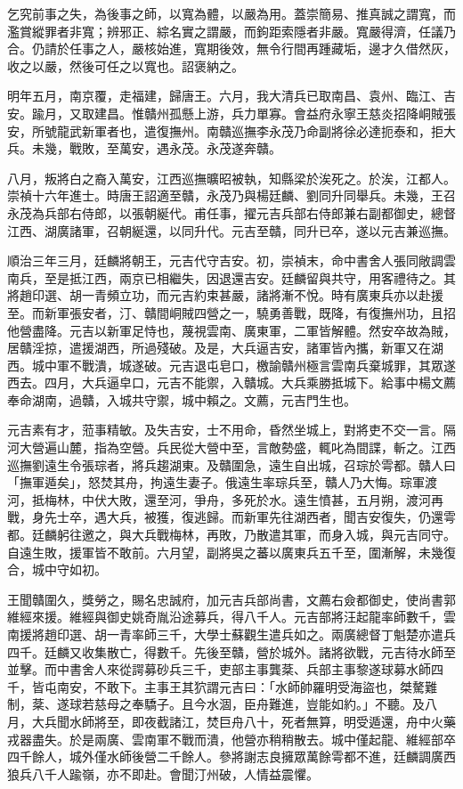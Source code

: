 \begin{pinyinscope}
乞究前事之失，為後事之師，以寬為體，以嚴為用。蓋崇簡易、推真誠之謂寬，而濫賞縱罪者非寬；辨邪正、綜名實之謂嚴，而鉤距索隱者非嚴。寬嚴得濟，任議乃合。仍請於任事之人，嚴核始進，寬期後效，無令行間再踵藏垢，邊才久借然灰，收之以嚴，然後可任之以寬也。詔褒納之。

明年五月，南京覆，走福建，歸唐王。六月，我大清兵已取南昌、袁州、臨江、吉安。踰月，又取建昌。惟贛州孤懸上游，兵力單寡。會益府永寧王慈炎招降峒賊張安，所號龍武新軍者也，遣復撫州。南贛巡撫李永茂乃命副將徐必達扼泰和，拒大兵。未幾，戰敗，至萬安，遇永茂。永茂遂奔贛。

八月，叛將白之裔入萬安，江西巡撫曠昭被執，知縣梁於涘死之。於涘，江都人。崇禎十六年進士。時唐王詔適至贛，永茂乃與楊廷麟、劉同升同舉兵。未幾，王召永茂為兵部右侍郎，以張朝綖代。甫任事，擢元吉兵部右侍郎兼右副都御史，總督江西、湖廣諸軍，召朝綖還，以同升代。元吉至贛，同升已卒，遂以元吉兼巡撫。

順治三年三月，廷麟將朝王，元吉代守吉安。初，崇禎末，命中書舍人張同敞調雲南兵，至是抵江西，兩京已相繼失，因退還吉安。廷麟留與共守，用客禮待之。其將趙印選、胡一青頻立功，而元吉約束甚嚴，諸將漸不悅。時有廣東兵亦以赴援至。而新軍張安者，汀、贛間峒賊四營之一，驍勇善戰，既降，有復撫州功，且招他營盡降。元吉以新軍足恃也，蔑視雲南、廣東軍，二軍皆解體。然安卒故為賊，居贛淫掠，遣援湖西，所過殘破。及是，大兵逼吉安，諸軍皆內攜，新軍又在湖西。城中軍不戰潰，城遂破。元吉退屯皂口，檄諭贛州極言雲南兵棄城罪，其眾遂西去。四月，大兵逼皁口，元吉不能禦，入贛城。大兵乘勝抵城下。給事中楊文薦奉命湖南，過贛，入城共守禦，城中賴之。文薦，元吉門生也。

元吉素有才，蒞事精敏。及失吉安，士不用命，昏然坐城上，對將吏不交一言。隔河大營遍山麓，指為空營。兵民從大營中至，言敵勢盛，輒叱為間諜，斬之。江西巡撫劉遠生令張琮者，將兵趨湖東。及贛圍急，遠生自出城，召琮於雩都。贛人曰「撫軍遁矣」，怒焚其舟，拘遠生妻子。俄遠生率琮兵至，贛人乃大悔。琮軍渡河，抵梅林，中伏大敗，還至河，爭舟，多死於水。遠生憤甚，五月朔，渡河再戰，身先士卒，遇大兵，被獲，復逃歸。而新軍先往湖西者，聞吉安復失，仍還雩都。廷麟躬往邀之，與大兵戰梅林，再敗，乃散遣其軍，而身入城，與元吉同守。自遠生敗，援軍皆不敢前。六月望，副將吳之蕃以廣東兵五千至，圍漸解，未幾復合，城中守如初。

王聞贛圍久，獎勞之，賜名忠誠府，加元吉兵部尚書，文薦右僉都御史，使尚書郭維經來援。維經與御史姚奇胤沿途募兵，得八千人。元吉部將汪起龍率師數千，雲南援將趙印選、胡一青率師三千，大學士蘇觀生遣兵如之。兩廣總督丁魁楚亦遣兵四千。廷麟又收集散亡，得數千。先後至贛，營於城外。諸將欲戰，元吉待水師至並擊。而中書舍人來從諤募砂兵三千，吏部主事龔棻、兵部主事黎遂球募水師四千，皆屯南安，不敢下。主事王其狖謂元吉曰：「水師帥羅明受海盜也，桀驁難制，棻、遂球若慈母之奉驕子。且今水涸，臣舟難進，豈能如約。」不聽。及八月，大兵聞水師將至，即夜截諸江，焚巨舟八十，死者無算，明受遁還，舟中火藥戎器盡失。於是兩廣、雲南軍不戰而潰，他營亦稍稍散去。城中僅起龍、維經部卒四千餘人，城外僅水師後營二千餘人。參將謝志良擁眾萬餘雩都不進，廷麟調廣西狼兵八千人踰嶺，亦不即赴。會聞汀州破，人情益震懼。


\end{pinyinscope}
